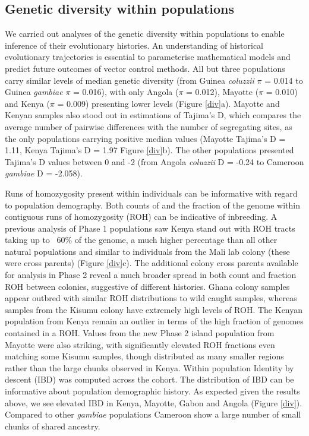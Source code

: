 \documentclass[a4paper,11pt,abstracton,hidelinks]{scrartcl}
\begin{document}
\subsection*{Genetic diversity within populations}

We carried out analyses of the genetic diversity within populations to enable inference of their evolutionary histories.
%
An understanding of historical evolutionary trajectories is essential to parameterise mathematical models and predict future outcomes of vector control methods.
%
%
All but three populations carry similar levels of median genetic diversity (from Guinea \textit{coluzzii} $\pi$ = 0.014 to Guinea \textit{gambiae} $\pi$ = 0.016), with only Angola ($\pi$ = 0.012), Mayotte ($\pi$ = 0.010) and Kenya ($\pi$ = 0.009) presenting lower levels (Figure \ref{div}a).
%
Mayotte and Kenyan samples also stood out in estimations of Tajima's D, which compares the average number of pairwise differences with the number of segregating sites, as the only populations carrying positive median values  (Mayotte Tajima's D = 1.11, Kenya Tajima's D = 1.97 Figure \ref{div}b).
%
The other populations presented Tajima's D values between 0 and -2 (from Angola \textit{coluzzii} D = -0.24 to Cameroon \textit{gambiae} D = -2.058).

Runs of homozygosity present within individuals can be informative with regard to population demography.
%
Both counts of and the fraction of the genome within contiguous runs of homozygosity (ROH) can be indicative of inbreeding.
%
A previous analysis of Phase 1 populations \cite{Ag1000gConsortium2017} saw Kenya stand out with ROH tracts taking up to ~60\% of the genome, a much higher percentage than all other natural populations and similar to individuals from the  Mali lab colony (these were cross parents) (Figure \ref{div}c). 
%
The additional colony cross parents available for analysis in Phase 2 reveal a much broader spread in both count and fraction ROH between colonies, suggestive of different histories.
%
Ghana colony samples appear outbred with similar ROH distributions to wild caught samples, whereas samples from the Kisumu colony have extremely high levels of ROH.    
%
The Kenyan population from Kenya remain an outlier in terms of the high fraction of genomes contained in a ROH.
%
Values from the new Phase 2 island population from Mayotte were also striking, with significantly elevated ROH fractions even matching some Kisumu samples, though distributed as many smaller regions rather than the large chunks observed in Kenya.
Within population Identity by descent (IBD) was computed across the cohort. 
%
The distribution of IBD can be informative about population demographic history. 
%
As expected given the results above, we see elevated IBD in Kenya, Mayotte, Gabon and Angola (Figure \ref{div}).
%
Compared to other \emph{gambiae} populations Cameroon show a large number of small chunks of shared ancestry.
\end{document}
